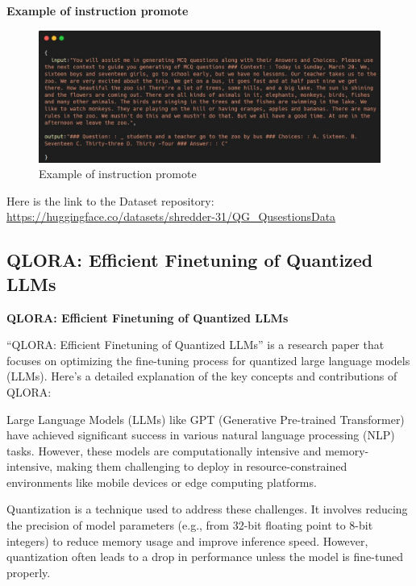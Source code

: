 \hfill \break
\textbf{Example of instruction promote} \\

\begin{center}
\begin{figure}[h!]
\centering
\includegraphics[scale=0.5,max height=\textheight,max width=\textwidth]{figures/instruction dataset.png}
\caption{ Example of instruction promote }
\end{figure}
\end{center}

\hfill \break
Here is the link to the Dataset repository: \url{https://huggingface.co/datasets/shredder-31/QG_QusestionsData}


\newpage
\subsection{QLORA: Efficient Finetuning of Quantized LLMs} 

\hfill \break
\textbf{QLORA: Efficient Finetuning of Quantized LLMs}

\hfill \break
``QLORA: Efficient Finetuning of Quantized LLMs'' \cite{dettmers2024qlora} is a research paper that focuses on optimizing the fine-tuning process for quantized large language models (LLMs). Here’s a detailed explanation of the key concepts and contributions of QLORA:


\hfill \break
Large Language Models (LLMs) like GPT (Generative Pre-trained Transformer) have achieved significant success in various natural language processing (NLP) tasks. However, these models are computationally intensive and memory-intensive, making them challenging to deploy in resource-constrained environments like mobile devices or edge computing platforms.

\hfill \break
Quantization is a technique used to address these challenges. It involves reducing the precision of model parameters (e.g., from 32-bit floating point to 8-bit integers) to reduce memory usage and improve inference speed. However, quantization often leads to a drop in performance unless the model is fine-tuned properly.

